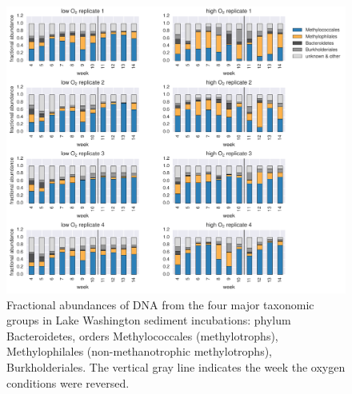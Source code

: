 \begin{figure}[H]
\centering
    \includegraphics[width=1.0\textwidth]{./tex/chapter2/figures/170413_4_main_groups.pdf}  %
    \begin{singlespace}
    \caption[Four major taxonomic groups in Lake Washington sediment incubations]{
        Fractional abundances of DNA from the four major taxonomic groups in Lake Washington sediment incubations:
	    phylum Bacteroidetes, orders Methylococcales (methylotrophs), Methylophilales (non-methanotrophic methylotrophs), Burkholderiales.
        The vertical gray line indicates the week the oxygen conditions were reversed.
        }
    \label{fig:4dominant_groups}
    \end{singlespace}
\end{figure}

